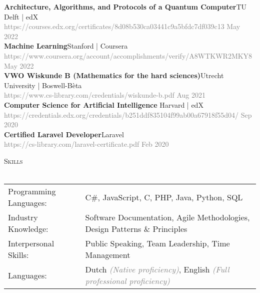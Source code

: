 \documentclass[a4paper]{article}
\newcommand{\lineunder} {
    \vspace*{-8pt} \\
    \hspace*{-18pt} \hrulefill \\
}
\newcommand{\header} [1] {
    {\hspace*{-18pt}\vspace*{6pt} \textsc{#1}}
    \vspace*{-6pt} \lineunder
}
\begin{document}
\textbf{Architecture, Algorithms, and Protocols of a Quantum Computer}\hfill TU Delft | edX\\
 \textcolor{gray}{https://courses.edx.org/certificates/8d08b530ca03441c9a5bfdc7df039c13} \hfill \textcolor{gray}{May 2022}\\
 \vspace{2mm}
 \textbf{Machine Learning}\hfill Stanford | Coursera\\
 \textcolor{gray}{https://www.coursera.org/account/accomplishments/verify/A8WTKWR2MKY8} \hfill \textcolor{gray}{May 2022}\\
 \vspace{2mm}
 \textbf{VWO Wiskunde B (Mathematics for the hard sciences)}\hfill Utrecht University | Boswell-Bèta\\
 \textcolor{gray}{https://www.cs-library.com/credentials/wiskunde-b.pdf}
 \hfill \textcolor{gray}{Aug 2021}\\
\vspace{2mm}
\textbf{Computer Science for Artificial Intelligence }\hfill Harvard | edX\\
\textcolor{gray}{https://credentials.edx.org/credentials/b251ddf835104f99ab00a67918f55d04/} \hfill \textcolor{gray}{Sep 2020}\\
\vspace{2mm}
\textbf{Certified Laravel Developer}\hfill Laravel\\
\textcolor{gray}{https://cs-library.com/laravel-certificate.pdf} \hfill \textcolor{gray}{Feb 2020}\\
\vspace{2mm}

\vspace{5mm}

\header{Skills}
\vspace{2mm}
\begin{tabular}{l l}

	Programming Languages:   & C\#, JavaScript, C, PHP, Java, Python, SQL
	\vspace{1mm}\\
    
	Industry Knowledge:      & Software Documentation, Agile Methodologies, Design Patterns \& Principles
	\vspace{1mm}\\
	
	Interpersonal Skills:    & Public Speaking, Team Leadership, Time Management
	\vspace{1mm}\\
	
    Languages:               & Dutch \textcolor{gray}{\emph{(Native proficiency)}}, English \textcolor{gray}{\emph{(Full professional proficiency)}}\\
    
\end{tabular}
\vspace{2mm}
\end{document}
